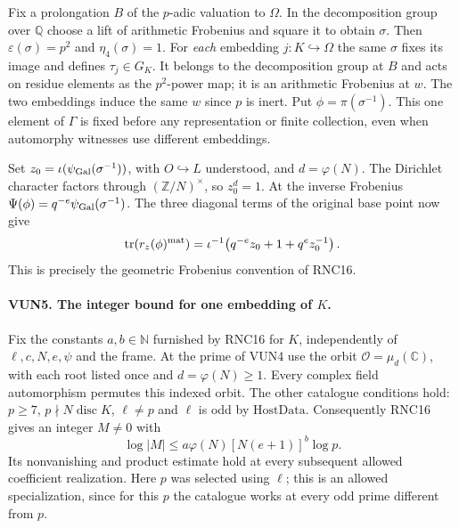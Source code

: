 Fix a prolongation $B$ of the $p$-adic valuation to $\Omega$.
In the decomposition group over $\mathbb Q$ choose a lift of
arithmetic Frobenius and square it to obtain $\sigma$. Then
$\varepsilon(\sigma)=p^2$ and $\eta_4(\sigma)=1$.
For \emph{each} embedding $j:K\hookrightarrow\Omega$ the same
$\sigma$ fixes its image and defines $\tau_j\in G_K$. It belongs
to the decomposition group at $B$ and acts on residue elements
as the $p^2$-power map; it is an arithmetic Frobenius at $w$.
The two embeddings induce the same $w$ since $p$ is inert. Put
$\phi=\pi(\sigma^{-1})$. This one element of $\Gamma$ is fixed
before any representation or finite collection, even when
automorphy witnesses use different embeddings.

Set $z_0=\iota(\psi_{\rm Gal}(\sigma^{-1}))$, with
$O\hookrightarrow L$ understood, and $d=\varphi(N)$. The
Dirichlet character factors through $(\mathbb Z/N)^\times$, so
$z_0^d=1$. At the inverse Frobenius
$\Psi(\phi)=q^{-e}\psi_{\rm Gal}(\sigma^{-1})$. The three
diagonal terms of the original base point now give
\[
 \operatorname{tr}(r_z(\phi)^{\rm mat})
   = \iota^{-1}\!\left(q^{-e}z_0+1+q^e z_0^{-1}\right).
\]
This is precisely the geometric Frobenius convention of RNC16.

\paragraph{VUN5. The integer bound for one embedding of $K$.}
\label{claim:VUN5}
Fix the constants $a,b\in\mathbb N$ furnished by RNC16 for $K$,
independently of $\ell,c,N,e,\psi$ and the frame. At the prime
of VUN4 use the orbit $\mathcal O=\mu_d(\mathbb C)$, with each
root listed once and $d=\varphi(N)\ge1$. Every complex field
automorphism permutes this indexed orbit. The other catalogue
conditions hold: $p\ge7$, $p\nmid N\operatorname{disc}K$,
$\ell\ne p$ and $\ell$ is odd by $\mathrm{HostData}$.
Consequently RNC16 gives an integer $M\ne0$ with
\[
             \log |M|\le a\varphi(N)[N(e+1)]^b\log p .
\]
Its nonvanishing and product estimate hold at every subsequent
allowed coefficient realization. Here $p$ was selected using
$\ell$; this is an allowed specialization, since for this $p$
the catalogue works at every odd prime different from $p$.

